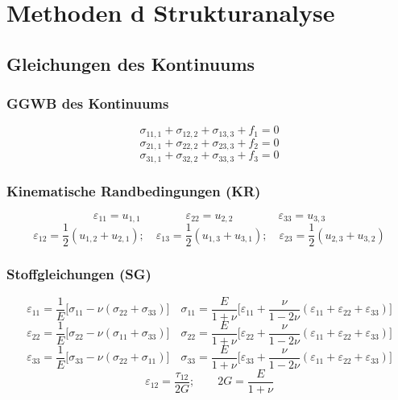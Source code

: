 \section{Methoden d Strukturanalyse}
    \subsection{Gleichungen des Kontinuums}
        \subsubsection{GGWB des Kontinuums}
            \small
            \[\sigma_{11,1} + \sigma_{12,2} + \sigma_{13,3} + f_1 = 0\]
            \[\sigma_{21,1} + \sigma_{22,2} + \sigma_{23,3} + f_2 = 0\]
            \[\sigma_{31,1} + \sigma_{32,2} + \sigma_{33,3} + f_3 = 0\]
            
        \subsubsection{Kinematische Randbedingungen (KR)}
            \[\varepsilon_{11} = u_{1,1}\qquad\qquad\varepsilon_{22} = u_{2,2}\qquad\qquad\varepsilon_{33} = u_{3,3}\]
            \[\varepsilon_{12} = \frac{1}{2}(u_{1,2} + u_{2,1});\quad\varepsilon_{13} = \frac{1}{2}(u_{1,3} + u_{3,1});\quad\varepsilon_{23} = \frac{1}{2}(u_{2,3} + u_{3,2})\]
            
        \subsubsection{Stoffgleichungen (SG)}
            \[\varepsilon_{11} = \frac{1}{E}\lbrack\sigma_{11} - \nu(\sigma_{22} + \sigma_{33})\rbrack \quad \sigma_{11}=\frac{E}{1+\nu}\lbrack\varepsilon_{11}+\frac{\nu}{1-2\nu}(\varepsilon_{11}+\varepsilon_{22}+\varepsilon_{33})\rbrack\]
            \[\varepsilon_{22} = \frac{1}{E}\lbrack\sigma_{22} - \nu(\sigma_{11} + \sigma_{33})\rbrack \quad \sigma_{22}=\frac{E}{1+\nu}\lbrack\varepsilon_{22}+\frac{\nu}{1-2\nu}(\varepsilon_{11}+\varepsilon_{22}+\varepsilon_{33})\rbrack\]
            \[\varepsilon_{33} = \frac{1}{E}\lbrack\sigma_{33} - \nu(\sigma_{22} + \sigma_{11})\rbrack \quad \sigma_{33}=\frac{E}{1+\nu}\lbrack\varepsilon_{33}+\frac{\nu}{1-2\nu}(\varepsilon_{11}+\varepsilon_{22}+\varepsilon_{33})\rbrack\]
            \[\varepsilon_{12}=\frac{\tau_{12}}{2G}; \qquad 2G=\frac{E}{1+\nu}\]
            \normalsize

    